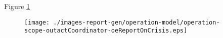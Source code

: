 Figure \ref{fig:lu.uni.lassy.excalibur.examples.icrash-OM-scopeView-operation-scope-outactCoordinator-oeReportOnCrisis}

\begin{figure}[htbp]
\begin{center}

\texttt{[image: ./images-report-gen/operation-model/operation-scope-outactCoordinator-oeReportOnCrisis.eps]}
\end{center}
\caption[lu.uni.lassy.excalibur.examples.icrash Operation Scope: operation-scope-outactCoordinator-oeReportOnCrisis]{}
\label{fig:lu.uni.lassy.excalibur.examples.icrash-OM-scopeView-operation-scope-outactCoordinator-oeReportOnCrisis}
\end{figure}
\vspace{0.5cm}

